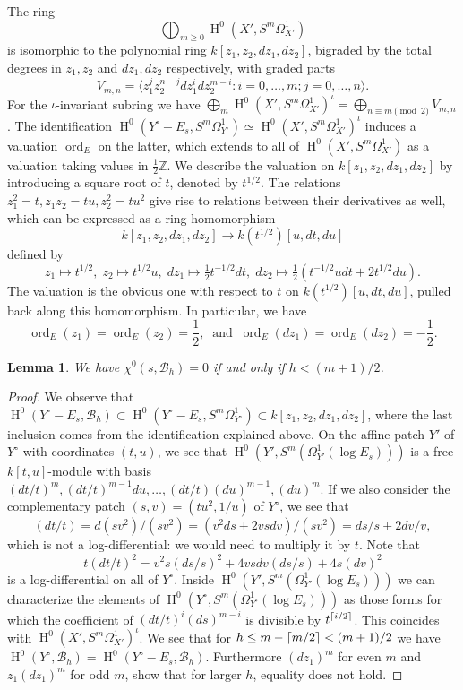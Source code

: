 \documentclass[12pt, reqno]{amsart}
\DeclarePairedDelimiter{\ceil}{\lceil}{\rceil}
\newtheorem{lemma}{Lemma}[section]
\theoremstyle{definition}
\newcommand{\Z}{{\mathbb Z}}
\newcommand{\calB}{{\mathcal B}}
\DeclareMathOperator{\HH}{H}
\DeclareMathOperator{\ord}{ord}
\numberwithin{equation}{section}
\numberwithin{table}{section}
\begin{document}
The ring
\[\bigoplus_{m\geq 0} \HH^0(X',S^m\Omega^1_{X'})\]
is isomorphic to the polynomial ring $k[z_1,z_2,dz_1,dz_2]$, bigraded by the total degrees in $z_1,z_2$ and $dz_1, dz_2$ respectively, with graded parts
\[
V_{m,n}=\langle z_1^jz_2^{n-j}dz_1^idz_2^{m-i}: i=0,\ldots,m; j=0,\ldots,n \rangle.
\]
For the $\iota$-invariant subring we have
$\bigoplus_m\HH^0(X',S^m\Omega^1_{X'})^{\iota}=\bigoplus_{n\equiv m\pmod 2} V_{m,n}$.
The identification $\HH^0(Y^\circ-E_s,S^m\Omega^1_{Y^\circ})\simeq \HH^0(X',S^m\Omega^1_{X'})^{\iota}$ induces a valuation $\ord_E$ on the latter, which extends to all of $\HH^0(X',S^m\Omega^1_{X'})$ as a valuation taking values in $\frac{1}{2}\Z$. We describe the valuation on $k[z_1,z_2,dz_1,dz_2]$ by introducing a square root of $t$, denoted by $t^{1/2}$. The relations $z_1^2=t, z_1z_2=tu, z_2^2=tu^2$ give rise to relations between their derivatives as well, which can be expressed as a ring homomorphism
\[k[z_1,z_2,dz_1,dz_2]\to k(t^{1/2})[u,dt,du]\]
defined by
\[z_1\mapsto t^{1/2},\;z_2\mapsto t^{1/2}u,\;
dz_1\mapsto \tfrac{1}{2}t^{-1/2}dt,\; dz_2\mapsto \tfrac{1}{2}(t^{-1/2}udt+2t^{1/2}du).
\]
The valuation is the obvious one with respect to $t$ on $k(t^{1/2})[u,dt,du]$, pulled back along this homomorphism. In particular, we have
\[
\ord_E(z_1) = \ord_E(z_2) = \frac{1}{2},\;\;\text{and}\;\;
\ord_E(dz_1) = \ord_E(dz_2) = -\frac{1}{2}.
\]

\begin{lemma}\label{L:chi0B} We have $\chi^0(s,\calB_h)=0$ if and only if $h <(m+1)/2$.
\end{lemma}
\begin{proof}
We observe that $\HH^0(Y^\circ-E_s,\calB_h)\subset\HH^0(Y^\circ-E_s,S^m\Omega_{Y^\circ}^1)\subset k[z_1,z_2,dz_1,dz_2]$, where the last inclusion comes from the identification explained above. On the affine patch $Y'$ of $Y^\circ$ with coordinates $(t,u)$, we see that $\HH^0(Y',S^m(\Omega^1_{Y'}(\log E_s)))$ is a free $k[t,u]$-module with basis $(dt/t)^m,(dt/t)^{m-1}du,\ldots,(dt/t)(du)^{m-1},(du)^m$.
If we also consider the complementary patch $(s,v)=(tu^2,1/u)$ of $Y^\circ$, we see that 
\[
(dt/t)=d(sv^2)/(sv^2)=(v^2ds+2vsdv)/(sv^2)=ds/s+2dv/v,
\] which is not a log-differential: we would need to multiply it by $t$. Note that
\[
t(dt/t)^2=v^2s(ds/s)^2+4vsdv(ds/s)+4s(dv)^2
\]
is a log-differential on all of $Y^\circ$. Inside $\HH^0(Y',S^m(\Omega^1_{Y'}(\log E_s)))$ we can characterize the elements of $\HH^0(Y^\circ,S^m(\Omega^1_{Y^\circ}(\log E_s)))$ as those forms for which the coefficient of $(dt/t)^i(ds)^{m-i}$ is divisible by $t^{\ceil{ i/2}}$. This coincides with $\HH^0(X',S^m\Omega^1_{X'})^\iota$. We see that for $h\leq m-\ceil{m/2} < (m+1)/2$ we have $\HH^0(Y^\circ,\calB_h)=\HH^0(Y^\circ-E_s,\calB_h)$. Furthermore $(dz_1)^m$ for even $m$ and $z_1(dz_1)^m$ for odd $m$, show that for larger $h$, equality does not hold.
\end{proof}
\end{document}
